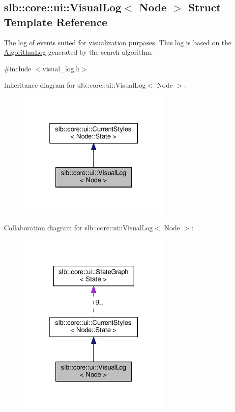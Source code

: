 \hypertarget{structslb_1_1core_1_1ui_1_1VisualLog}{}\subsection{slb\+:\+:core\+:\+:ui\+:\+:Visual\+Log$<$ Node $>$ Struct Template Reference}
\label{structslb_1_1core_1_1ui_1_1VisualLog}


The log of events suited for visualization purposes. This log is based on the \hyperlink{structslb_1_1core_1_1ui_1_1AlgorithmLog}{Algorithm\+Log} generated by the search algorithm.  




{\ttfamily \#include $<$visual\+\_\+log.\+h$>$}



Inheritance diagram for slb\+:\+:core\+:\+:ui\+:\+:Visual\+Log$<$ Node $>$\+:\nopagebreak
\begin{figure}[H]
\begin{center}
\leavevmode
\includegraphics[width=214pt]{structslb_1_1core_1_1ui_1_1VisualLog__inherit__graph}
\end{center}
\end{figure}


Collaboration diagram for slb\+:\+:core\+:\+:ui\+:\+:Visual\+Log$<$ Node $>$\+:\nopagebreak
\begin{figure}[H]
\begin{center}
\leavevmode
\includegraphics[width=214pt]{structslb_1_1core_1_1ui_1_1VisualLog__coll__graph}
\end{center}
\end{figure}
